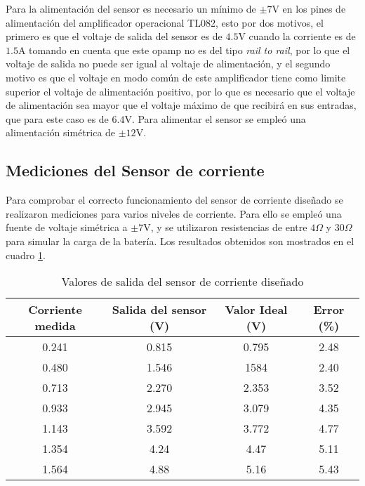    Para la alimentación del sensor es necesario un mínimo de $\pm7\text{V}$ en
    los pines de alimentación del amplificador operacional TL082, esto por dos 
    motivos, el primero es que el voltaje de salida del sensor es de $4.5\text{V}$
    cuando la corriente es de $1.5\text{A}$ tomando en cuenta que este opamp 
    no es del tipo \textit{rail to rail}, por lo que el voltaje de salida no
    puede ser igual al voltaje de alimentación, y el segundo motivo es que el
    voltaje en modo común de este amplificador tiene como limite superior el
    voltaje de alimentación positivo, por lo que es necesario que el voltaje 
    de alimentación sea mayor que el voltaje máximo de que recibirá en sus entradas,
    que para este caso es de $6.4\text{V}$. Para alimentar el sensor se empleó
    una alimentación simétrica de $\pm 12\text{V}$.
    
    \subsection{Mediciones del Sensor de corriente}

    Para comprobar el correcto funcionamiento del sensor de corriente diseñado
    se realizaron mediciones para varios niveles de corriente. Para ello se
    empleó una fuente de voltaje simétrica a $\pm7\text{V}$, y se utilizaron resistencias de entre 
    $4\Omega$ y $30\Omega$ para simular la carga de la batería. Los resultados 
    obtenidos son mostrados en el cuadro \ref{tb:mediciones_sensor}. 

\begin{table}[H]
    \centering
    \begin{tabular}{|c|c|c|c|}
        \hline
    Corriente medida & Salida del sensor (V) & Valor Ideal (V) & Error (\%) \\
    \hline
    0.241            & 0.815                 & 0.795           & 2.48       \\
    0.480            & 1.546                 & 1584            & 2.40       \\
    0.713            & 2.270                 & 2.353           & 3.52       \\
    0.933            & 2.945                 & 3.079           & 4.35       \\
    1.143            & 3.592                 & 3.772           & 4.77       \\
    1.354            & 4.24                  & 4.47            & 5.11       \\
    1.564            & 4.88                  & 5.16            & 5.43 \\
     \hline     
    \end{tabular}

    \caption{Valores de salida del sensor de corriente diseñado}
    \label{tb:mediciones_sensor}
    \end{table}


